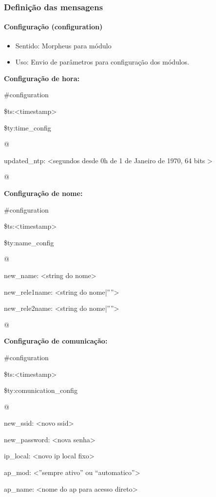 \subsubsection{Definição das mensagens}
\paragraph{Configuração (configuration)}
\begin{itemize}
\item Sentido: Morpheus para módulo
\item Uso: Envio de parâmetros para configuração dos módulos.
\end{itemize}

\textbf{Configuração de hora:}

\#configuration

\$ts:\textless timestamp\textgreater

\$ty:time\_config

@

updated\_ntp: \textless segundos desde 0h de 1 de Janeiro de 1970, 64 bits \textgreater

@

\textbf{Configuração de nome:}

\#configuration

\$ts:\textless timestamp\textgreater

\$ty:name\_config

@

new\_name: \textless string do nome\textgreater

new\_rele1name: \textless string do nome|””\textgreater

new\_rele2name: \textless string do nome|””\textgreater

@

\textbf{Configuração de comunicação:}

\#configuration

\$ts:\textless timestamp\textgreater

\$ty:comunication\_config

@

new\_ssid: \textless novo ssid\textgreater

new\_password: \textless nova senha\textgreater

ip\_local: \textless novo ip local fixo\textgreater

ap\_mod: \textless ”sempre ativo” ou “automatico”\textgreater

ap\_name: \textless nome do ap para acesso direto\textgreater


